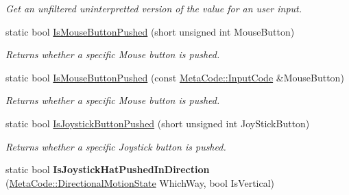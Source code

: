 \begin{DoxyCompactItemize}
\begin{DoxyCompactList}\small\item\em Get an unfiltered uninterpretted version of the value for an user input. \item\end{DoxyCompactList}\item 
static bool \hyperlink{classphys_1_1InputQueryTool_aab9a7be4d95289d828378f7f3d5fc065}{IsMouseButtonPushed} (short unsigned int MouseButton)
\begin{DoxyCompactList}\small\item\em Returns whether a specific Mouse button is pushed. \item\end{DoxyCompactList}\item 
static bool \hyperlink{classphys_1_1InputQueryTool_ab061aab57ff35cb1c18656f5ee4f384e}{IsMouseButtonPushed} (const \hyperlink{classphys_1_1MetaCode_a3e501cbb5bf0f6f1fdb7211465bda8d8}{MetaCode::InputCode} \&MouseButton)
\begin{DoxyCompactList}\small\item\em Returns whether a specific Mouse button is pushed. \item\end{DoxyCompactList}\item 
static bool \hyperlink{classphys_1_1InputQueryTool_ae3e63f8f93a0b270b22e685d3b86c890}{IsJoystickButtonPushed} (short unsigned int JoyStickButton)
\begin{DoxyCompactList}\small\item\em Returns whether a specific Joystick button is pushed. \item\end{DoxyCompactList}\item 
\hypertarget{classphys_1_1InputQueryTool_a47b0d887f62fcd43f75308c6269e8411}{
static bool {\bfseries IsJoystickHatPushedInDirection} (\hyperlink{classphys_1_1MetaCode_ad6ed6266b5f4219a6f5da29ebe018757}{MetaCode::DirectionalMotionState} WhichWay, bool IsVertical)}
\label{classphys_1_1InputQueryTool_a47b0d887f62fcd43f75308c6269e8411}


\end{DoxyCompactItemize}
